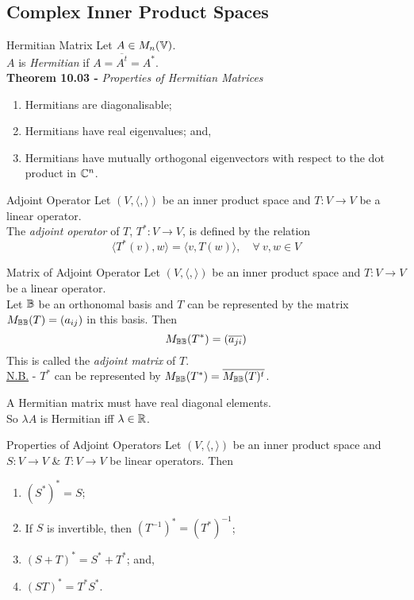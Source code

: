\documentclass[11pt,a4paper]{article}
\begin{document}
\subsection{Complex Inner Product Spaces}

\subtitle{Definition 10.02 - }{Hermitian Matrix}
Let $A \in M_n(\mathbb{V})$.\\
$A$ is \textit{Hermitian} if $A = \overline{A^t} = A^*$.\\

\textbf{Theorem 10.03 - }\textit{Properties of Hermitian Matrices}
\begin{enumerate}[label=\roman*)]
  \item Hermitians are diagonalisable;
  \item Hermitians have real eigenvalues; and,
  \item Hermitians have mutually orthogonal eigenvectors with respect to the dot product in $\mathbb{C}^n$.
\end{enumerate}

\subtitle{Definition 10.04 - }{Adjoint Operator}
Let $(V, \langle,\rangle)$ be an inner product space and $T : V \to V$ be a linear operator.\\
The \textit{adjoint operator} of $T$, $T^* : V \to V$, is defined by the relation
$$\langle T^*(v), w \rangle = \langle v, T(w) \rangle,\quad \forall\ v, w \in V$$

\subtitle{Theorem 10.05 - }{Matrix of Adjoint Operator}
Let $(V, \langle,\rangle)$ be an inner product space and $T : V \to V$ be a linear operator.\\
Let $\mathbb{B}$ be an orthonomal basis and $T$ can be represented by the matrix $M_{\mathbb{B}\mathbb{B}}(T) = (a_{ij})$ in this basis. Then
$$M_{\mathbb{B}\mathbb{B}}(T^*) = (\overline{a_{ji}})$$
This is called the \textit{adjoint matrix} of $T$.\\
\underline{N.B.} - $T^*$ can be represented by $M_{\mathbb{B}\mathbb{B}}(T^*) = \overline{M_{\mathbb{B}\mathbb{B}}(T)^t}$.\\

\subtitle{Proposition 10.06}{}
A Hermitian matrix must have real diagonal elements.\\
So $\lambda A$ is Hermitian iff $\lambda \in \mathbb{R}$.\\

\subtitle{Theorem 10.07 - }{Properties of Adjoint Operators}
Let $(V, \langle,\rangle)$ be an inner product space and $S : V \to V$ \& $T : V \to V$ be linear operators. Then
\begin{enumerate}[label=\roman*)]
  \item $(S^*)^* = S$;
  \item If $S$ is invertible, then $(T^{-1})^* = (T^*)^{-1}$;
  \item $(S + T)^* = S^* + T^*$; and,
  \item $(ST)^* = T^*S^*$.
\end{enumerate}
\end{document}
